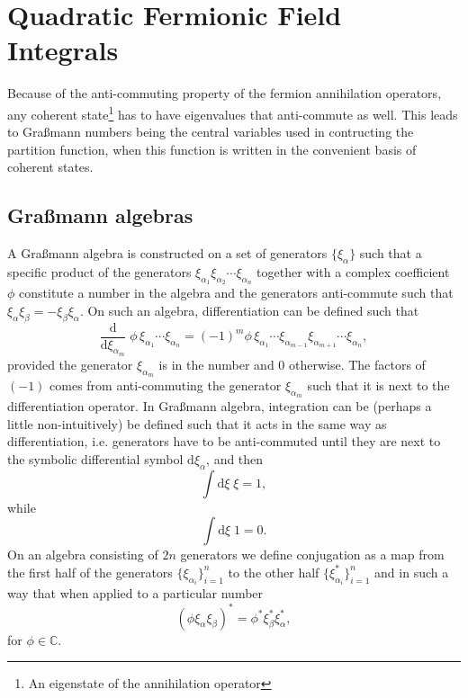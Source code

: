 \section{Quadratic Fermionic Field Integrals}

Because of the anti-commuting property of the fermion annihilation operators, any coherent state\footnote{An eigenstate
of the annihilation operator} has to have eigenvalues that anti-commute as well. 
This leads to Gra\ss mann numbers being the central variables used in contructing the partition function, when this function
is written in the convenient basis of coherent states.

\subsection{Gra\ss mann algebras}
A Gra\ss mann algebra is constructed on a set of generators $\{\xi_\alpha\}$ such that a specific product
of the generators $\xi_{\alpha_1}\xi_{\alpha_2}\cdots\xi_{\alpha_n}$ together with a complex coefficient $\phi$ constitute a
number in the algebra and the generators anti-commute such that $\xi_\alpha\xi_\beta = -\xi_\beta\xi_\alpha$. On such
an algebra, differentiation can be defined such that
\begin{equation}
    \label{eq:Field:Ferm:Grass:diff}
    \frac{\mathrm{d}}{\mathrm{d}\xi_{\alpha_m}}\;\phi\,\xi_{\alpha_1}\cdots\xi_{\alpha_n} = (-1)^m\phi\,\xi_{\alpha_1}\cdots\xi_{\alpha_{m-1}}\xi_{\alpha_{m+1}}\cdots\xi_{\alpha_n},
\end{equation}
provided the generator $\xi_{\alpha_m}$ is in the number and $0$ otherwise. The factors of $(-1)$ comes from anti-commuting
the generator $\xi_{\alpha_m}$ such that it is next to the differentiation operator. In Gra\ss mann algebra, integration
can be (perhaps a little non-intuitively) be defined such that it acts in the same way as differentiation, i.e. generators
have to be anti-commuted until they are next to the symbolic differential symbol $\mathrm{d}\xi_{\alpha}$, and then
\begin{equation}
    \label{eq:Field:Ferm:Grass:int}
    \int\!\mathrm{d}\xi\;\xi = 1,
\end{equation}
while
\begin{equation}
    \label{eq:Field:Ferm:Grass:int2}
    \int\!\mathrm{d}\xi\;1 = 0.
\end{equation}
On an algebra consisting of $2n$ generators we define conjugation as a map from the first half of the generators $\{\xi_{\alpha_i}\}_{i=1}^n$
to the other half $\{\xi_{\alpha_i}^\ast\}_{i=1}^n$ and in such a way that when applied to a particular number
\begin{equation}
    \label{eq:Field:Ferm:Grass:conj}
    (\phi\xi_\alpha\xi_\beta)^\ast = \phi^\ast\xi_\beta^\ast\xi_\alpha^\ast,
\end{equation}
for $\phi\in\mathbb{C}$.

